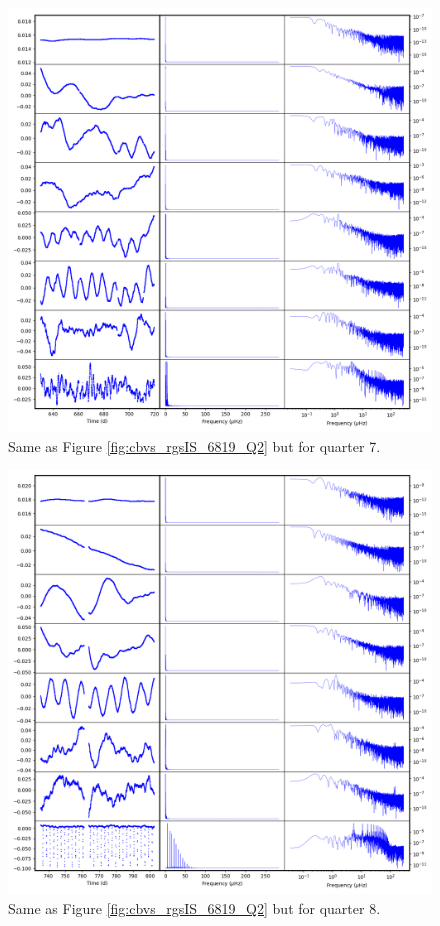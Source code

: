 \begin{figure}
    \centering
    \includegraphics[width=\linewidth]{Chapter_Appended/AppB/cbv_6819_rgs_q07.png}
    \caption{Same as Figure \ref{fig:cbvs_rgsIS_6819_Q2} but for quarter 7.}
    \label{fig:cbvs_rgsIS_6819_Q07}
\end{figure}


\begin{figure}
    \centering
    \includegraphics[width=\linewidth]{Chapter_Appended/AppB/cbv_6819_rgs_q08.png}
    \caption{Same as Figure \ref{fig:cbvs_rgsIS_6819_Q2} but for quarter 8.}
    \label{fig:cbvs_rgsIS_6819_Q08}
\end{figure}


